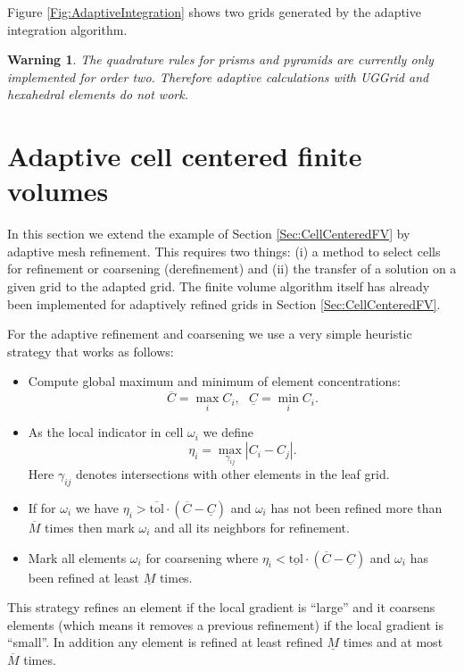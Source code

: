 \documentclass[11pt,a4paper,headinclude,footinclude,DIV16,normalheadings]{scrreprt}
\newtheorem{warn}[exc]{Warning}
\begin{document}
Figure \ref{Fig:AdaptiveIntegration} shows two grids generated by the
adaptive integration algorithm. 

\begin{warn} The quadrature rules for prisms and pyramids are
  currently only implemented for order two. Therefore adaptive
  calculations with UGGrid and hexahedral elements do not work.
\end{warn}



\section{Adaptive cell centered finite volumes}

In this section we extend the example of Section
\ref{Sec:CellCenteredFV} by adaptive mesh refinement. This requires
two things: (i) a method to select cells for refinement or coarsening
(derefinement) and (ii) the transfer of a solution on a given grid to
the adapted grid. The finite volume algorithm itself has already been
implemented for adaptively refined grids in Section
\ref{Sec:CellCenteredFV}.

For the adaptive refinement and coarsening we use a very simple
heuristic strategy that works as follows:
\begin{itemize}
\item Compute global maximum and minimum of element concentrations:
  $$\overline{C}=\max_i C_i,  \ \ \ \underline{C}=\min_i C_i.$$
\item As the local indicator in cell $\omega_i$ we define $$\eta_i =
  \max_{\gamma_{ij}} |C_i-C_j|.$$ Here $\gamma_{ij}$ denotes
  intersections with other elements in the leaf grid.
\item If for $\omega_i$ we have
  $\eta_i>\overline{\text{tol}}\cdot (\overline{C}-\underline{C})$
  and $\omega_i$ has not been refined more than $\overline{M}$ times
  then mark $\omega_i$ and all its neighbors for refinement.
\item Mark all elements $\omega_i$ for coarsening where
  $\eta_i<\underline{\text{tol}}\cdot (\overline{C}-\underline{C})$
  and $\omega_i$ has been refined at least $\underline{M}$ times.
\end{itemize}

This strategy refines an element if the local gradient is ``large''
and it coarsens elements (which means it removes a previous
refinement) if the local gradient is ``small''. In addition any
element is refined at least refined $\underline{M}$ times and at most
$\overline{M}$ times.
\end{document}
